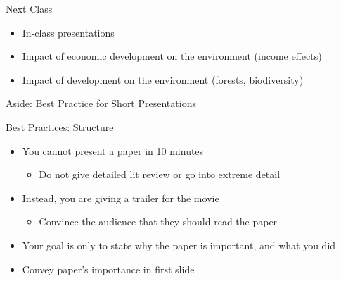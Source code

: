 \documentclass[
  ignorenonframetext,
  aspectratio=169]{beamer}
\providecommand{\tightlist}{%
  \setlength{\itemsep}{0pt}\setlength{\parskip}{0pt}}
\begin{document}
\begin{frame}{Next Class}
\protect\hypertarget{next-class}{}
\begin{itemize}
\item
  In-class presentations
\item
  Impact of economic development on the environment (income effects)
\item
  Impact of development on the environment (forests, biodiversity)
\end{itemize}
\end{frame}

\begin{frame}{}
\protect\hypertarget{section-7}{}
\huge

Aside: Best Practice for Short Presentations
\end{frame}

\begin{frame}{Best Practices: Structure}
\protect\hypertarget{best-practices-structure}{}
\begin{itemize}
\tightlist
\item
  You cannot present a paper in 10 minutes

  \begin{itemize}
  \tightlist
  \item
    Do not give detailed lit review or go into extreme detail
  \end{itemize}
\end{itemize}

\vfill

\begin{itemize}
\tightlist
\item
  Instead, you are giving a trailer for the movie

  \begin{itemize}
  \tightlist
  \item
    Convince the audience that they should read the paper
  \end{itemize}
\end{itemize}

\vfill

\begin{itemize}
\item
  Your goal is only to state why the paper is important, and what you
  did \vfill
\item
  Convey paper's importance in first slide
\end{itemize}
\end{frame}
\end{document}
